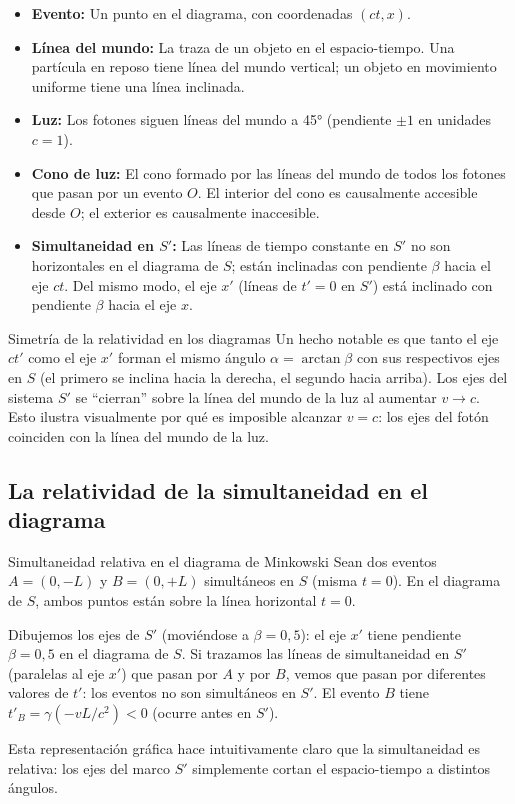 \begin{itemize}[leftmargin=2em]
  \item \textbf{Evento:} Un punto en el diagrama, con coordenadas $(ct, x)$.
  \item \textbf{Línea del mundo:} La traza de un objeto en el espacio-tiempo. Una partícula en reposo tiene línea del mundo vertical; un objeto en movimiento uniforme tiene una línea inclinada.
  \item \textbf{Luz:} Los fotones siguen líneas del mundo a 45° (pendiente $\pm 1$ en unidades $c = 1$).
  \item \textbf{Cono de luz:} El cono formado por las líneas del mundo de todos los fotones que pasan por un evento $O$. El interior del cono es causalmente accesible desde $O$; el exterior es causalmente inaccesible.
  \item \textbf{Simultaneidad en $S'$:} Las líneas de tiempo constante en $S'$ no son horizontales en el diagrama de $S$; están inclinadas con pendiente $\beta$ hacia el eje $ct$. Del mismo modo, el eje $x'$ (líneas de $t' = 0$ en $S'$) está inclinado con pendiente $\beta$ hacia el eje $x$.
\end{itemize}

\begin{observacion}{Simetría de la relatividad en los diagramas}{}
Un hecho notable es que tanto el eje $ct'$ como el eje $x'$ forman el mismo ángulo $\alpha = \arctan\beta$ con sus respectivos ejes en $S$ (el primero se inclina hacia la derecha, el segundo hacia arriba). Los ejes del sistema $S'$ se ``cierran'' sobre la línea del mundo de la luz al aumentar $v \to c$. Esto ilustra visualmente por qué es imposible alcanzar $v = c$: los ejes del fotón coinciden con la línea del mundo de la luz.
\end{observacion}

\subsection{La relatividad de la simultaneidad en el diagrama}

\begin{ejemplo}{Simultaneidad relativa en el diagrama de Minkowski}{}
Sean dos eventos $A = (0, -L)$ y $B = (0, +L)$ simultáneos en $S$ (misma $t = 0$). En el diagrama de $S$, ambos puntos están sobre la línea horizontal $t = 0$.

Dibujemos los ejes de $S'$ (moviéndose a $\beta = 0{,}5$): el eje $x'$ tiene pendiente $\beta = 0{,}5$ en el diagrama de $S$. Si trazamos las líneas de simultaneidad en $S'$ (paralelas al eje $x'$) que pasan por $A$ y por $B$, vemos que pasan por diferentes valores de $t'$: los eventos no son simultáneos en $S'$. El evento $B$ tiene $t'_B = \gamma(-vL/c^2) < 0$ (ocurre antes en $S'$).

Esta representación gráfica hace intuitivamente claro que la simultaneidad es relativa: los ejes del marco $S'$ simplemente cortan el espacio-tiempo a distintos ángulos.
\end{ejemplo}

